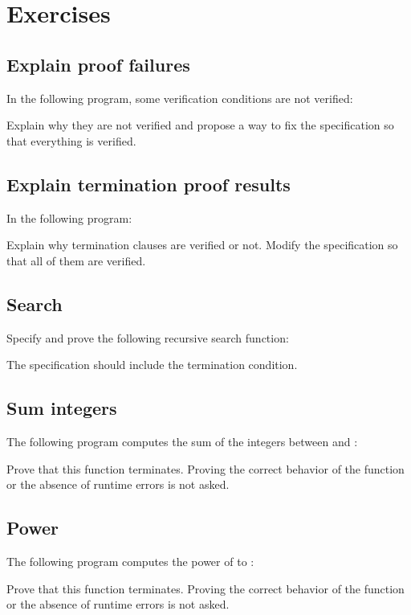 

\section{Exercises}


\subsection{Explain proof failures}


In the following program, some verification conditions are not verified:




Explain why they are not verified and propose a way to fix the specification so
that everything is verified.


\subsection{Explain termination proof results}


In the following program:




Explain why termination clauses are verified or not. Modify the specification so
that all of them are verified.


\subsection{Search}


Specify and prove the following recursive search function:




The specification should include the termination condition.


\subsection{Sum integers}


The following program computes the sum of the integers between 
and :




Prove that this function terminates. Proving the correct behavior of the
function or the absence of runtime errors is not asked.


\subsection{Power}


The following program computes the power of  to :




Prove that this function terminates. Proving the correct behavior of the
function or the absence of runtime errors is not asked.
